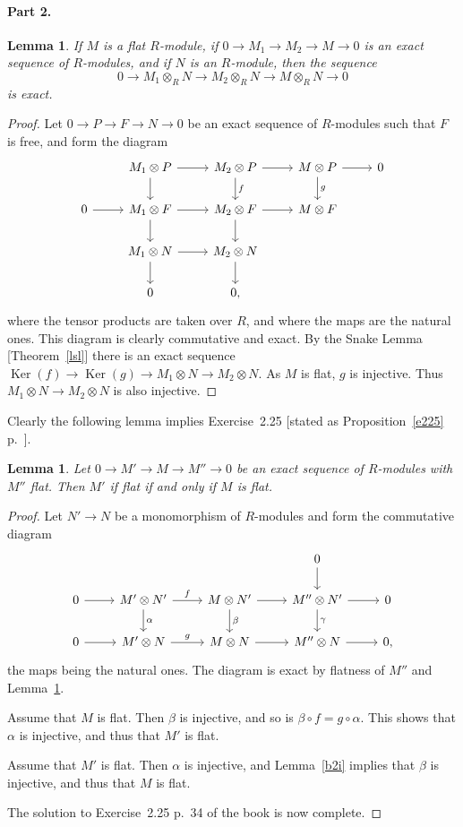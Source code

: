 \documentclass[12pt,letterpaper]{article}%
\newcommand{\oo}{\operatorname}\newcommand{\ooo}{\operatorname*}
\newtheorem{lem}[thm]{Lemma}
\begin{document}
\paragraph{Part 2.}

\begin{lem}\label{b254}
If $M$ is a flat $R$-module, if $0\to M_1\to M_2\to M\to0$ is an exact sequence of $R$-modules, and if $N$ is an $R$-module, then the sequence 
$$
0\to M_1\otimes_RN\to M_2\otimes_RN\to M\otimes_RN\to0
$$ 
is exact.
\end{lem}

\begin{proof}
Let $0\to P\to F\to N\to 0$ be an exact sequence of $R$-modules such that $F$ is free, and form the diagram
$$
\begin{tikzcd}
&M_1\otimes P\ar[d]\ar[r]&M_2\otimes P\ar[d,"f"]\ar[r]&M\otimes P\ar[d,"g"]\ar[r]&0\\ 
0\ar[r]&M_1\otimes F\ar[d]\ar[r]&M_2\otimes F\ar[d]\ar[r]&M\otimes F\\ 
&M_1\otimes N\ar[d]\ar[r]&M_2\otimes N\ar[d]\\ 
&0&0,
\end{tikzcd}
$$ 
where the tensor products are taken over $R$, and where the maps are the natural ones. This diagram is clearly commutative and exact. By the Snake Lemma [Theorem~\ref{lsl}] there is an exact sequence  
$
\oo{Ker}(f)\to\oo{Ker}(g)\to M_1\otimes N\to M_2\otimes N.
$ 
As $M$ is flat, $g$ is injective. Thus $M_1\otimes N\to M_2\otimes N$ is also injective. 
\end{proof}

Clearly the following lemma implies Exercise~2.25 [stated as Proposition~\ref{e225} p.~\pageref{e225}].

\begin{lem}
Let $0\to M'\to M\to M''\to0$ be an exact sequence of $R$-modules with $M''$ flat. Then $M'$ if flat if and only if $M$ is flat.
\end{lem}

\begin{proof}
Let $N'\to N$ be a monomorphism of $R$-modules and form the commutative diagram 
$$
\begin{tikzcd}
&&&0\ar[d]\\ 
0\ar[r]&M'\otimes N'\ar[d,"\alpha"]\ar[r,"f"]&M\otimes N'\ar[d,"\beta"]\ar[r]&M''\otimes N'\ar[d,"\gamma"]\ar[r]&0\\ 
0\ar[r]&M'\otimes N\ar[r,"g"]&M\otimes N\ar[r]&M''\otimes N\ar[r]&0,
\end{tikzcd}
$$ 
the maps being the natural ones. The diagram is exact by flatness of $M''$ and Lemma~\ref{b254}.

Assume that $M$ is flat. Then $\beta$ is injective, and so is $\beta\circ f=g\circ\alpha$. This shows that $\alpha$ is injective, and thus that $M'$ is flat.

Assume that $M'$ is flat. Then $\alpha$ is injective, and Lemma~\ref{b2i} implies that $\beta$ is injective, and thus that $M$ is flat.

The solution to Exercise~2.25 p.~34 of the book is now complete.
\end{proof} 
\end{document}
